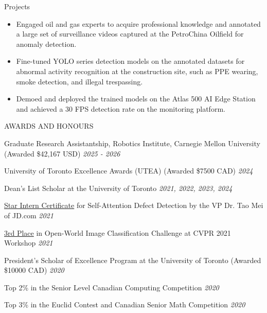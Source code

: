 \documentclass{resume} %
\begin{document}
\begin{rSection}{Projects}
\begin{itemize}
    \vspace{-0.2cm}\item Engaged oil and gas experts to acquire professional knowledge and annotated a large set of surveillance videos captured at the PetroChina Oilfield for anomaly detection. \vspace{-0.2cm}\item Fine-tuned YOLO series detection models on the annotated datasets for abnormal activity recognition at the construction site, such as PPE wearing, smoke detection, and illegal trespassing. \vspace{-0.2cm}\item Demoed and deployed the trained models on the Atlas 500 AI Edge Station and achieved a 30 FPS detection rate on the monitoring platform.
\end{itemize}

\end{rSection}


\begin{rSection}{AWARDS AND HONOURS}

{Graduate Research Assistantship, Robotics Institute, Carnegie Mellon University (Awarded \$42,167 USD)} \hfill {\em 2025 - 2026} 

{University of Toronto Excellence Awards (UTEA) (Awarded \$7500 CAD)} \hfill {\em 2024} 

{Dean’s List Scholar at the University of Toronto} \hfill {\em 2021, 2022, 2023, 2024} 

{\href{https://drive.google.com/file/d/1Kh5xj82v_ihqysz4ZNyljiYcowwQaKLJ/view?usp=sharing}{Star Intern Certificate} for Self-Attention Defect Detection by the VP Dr. Tao Mei of JD.com} \hfill {\em 2021} 

{\href{https://drive.google.com/file/d/1iDYAeq4svOW1rlZM59sz7bu7gQqT2jW7/view}{3rd Place} in Open-World Image Classification Challenge at CVPR 2021 Workshop} \hfill {\em 2021} 

{President’s Scholar of Excellence Program at the University of Toronto (Awarded \$10000 CAD)} \hfill {\em 2020} 

{Top 2\% in the Senior Level Canadian Computing Competition} \hfill {\em 2020} 

{Top 3\% in the Euclid Contest and Canadian Senior Math Competition} \hfill {\em 2020} 

\end{rSection}
\end{document}
